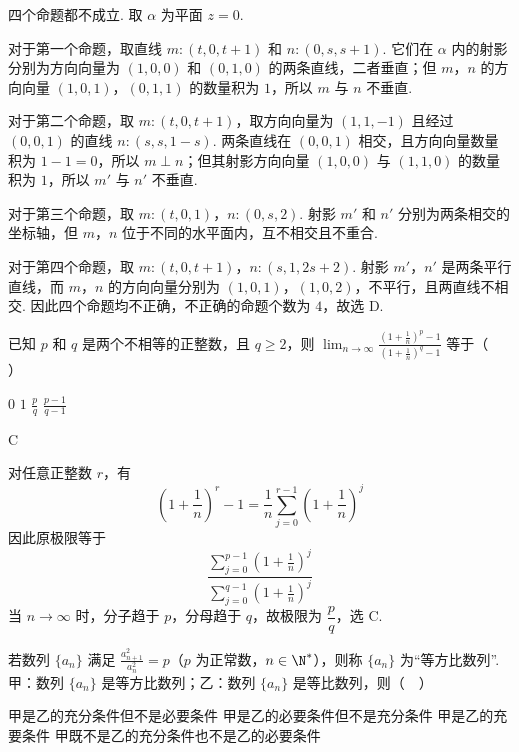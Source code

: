 \begin{solution}
四个命题都不成立. 取 \(\alpha\) 为平面 \(z=0\).

对于第一个命题，取直线 \(m:(t,0,t+1)\) 和 \(n:(0,s,s+1)\). 它们在 \(\alpha\) 内的射影分别为方向向量为 \((1,0,0)\) 和 \((0,1,0)\) 的两条直线，二者垂直；但 \(m\)，\(n\) 的方向向量 \((1,0,1)\)，\((0,1,1)\) 的数量积为 \(1\)，所以 \(m\) 与 \(n\) 不垂直.

对于第二个命题，取 \(m:(t,0,t+1)\)，取方向向量为 \((1,1,-1)\) 且经过 \((0,0,1)\) 的直线 \(n:(s,s,1-s)\). 两条直线在 \((0,0,1)\) 相交，且方向向量数量积为 \(1-1=0\)，所以 \(m\perp n\)；但其射影方向向量 \((1,0,0)\) 与 \((1,1,0)\) 的数量积为 \(1\)，所以 \(m'\) 与 \(n'\) 不垂直.

对于第三个命题，取 \(m:(t,0,1)\)，\(n:(0,s,2)\). 射影 \(m'\) 和 \(n'\) 分别为两条相交的坐标轴，但 \(m\)，\(n\) 位于不同的水平面内，互不相交且不重合.

对于第四个命题，取 \(m:(t,0,t+1)\)，\(n:(s,1,2s+2)\). 射影 \(m'\)，\(n'\) 是两条平行直线，而 \(m\)，\(n\) 的方向向量分别为 \((1,0,1)\)，\((1,0,2)\)，不平行，且两直线不相交. 因此四个命题均不正确，不正确的命题个数为 \(4\)，故选 D.
\end{solution}

\begin{problem}
已知 \(p\) 和 \(q\) 是两个不相等的正整数，且 \(q \geqslant 2\)，则 \(\displaystyle\lim_{n\to\infty} \frac{\left(1 + \frac{1}{n}\right)^p - 1}{\left(1 + \frac{1}{n}\right)^q - 1}\) 等于（\(\quad\)）

\choices
    {\(0\)}
    {\(1\)}
    {\(\frac{p}{q}\)}
    {\(\frac{p - 1}{q - 1}\)}
\end{problem}

\begin{answer}
C
\end{answer}

\begin{solution}
对任意正整数 \(r\)，有
\[
\left(1+\frac{1}{n}\right)^r-1=\frac{1}{n}\sum_{j=0}^{r-1}\left(1+\frac{1}{n}\right)^j
\]
因此原极限等于
\[
\frac{\sum_{j=0}^{p-1}\left(1+\frac{1}{n}\right)^j}{\sum_{j=0}^{q-1}\left(1+\frac{1}{n}\right)^j}
\]
当 \(n\to\infty\) 时，分子趋于 \(p\)，分母趋于 \(q\)，故极限为 \(\dfrac{p}{q}\)，选 C.
\end{solution}

\begin{problem}
若数列 \(\{a_{n}\}\) 满足 \(\frac{a_{n+1}^2}{a_{n}^2} = p\)（\(p\) 为正常数，\(n \in \N^{*}\)），则称 \(\{a_n\}\) 为“等方比数列”. 甲：数列 \(\{a_n\}\) 是等方比数列；乙：数列 \(\{a_n\}\) 是等比数列，则（\(\quad\)）

\choices
    {甲是乙的充分条件但不是必要条件}
    {甲是乙的必要条件但不是充分条件}
    {甲是乙的充要条件}
    {甲既不是乙的充分条件也不是乙的必要条件}
\end{problem}

